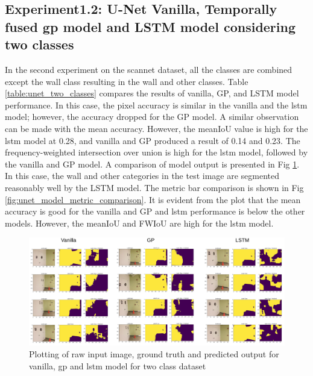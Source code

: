     \subsection{Experiment1.2: U-Net Vanilla, Temporally fused gp model and LSTM model considering two classes}
	In the second experiment on the scannet dataset, all the classes are combined except the wall class resulting in the wall and other classes. Table \ref{table:unet_two_classes} compares the results of vanilla, GP, and LSTM model performance. In this case, the pixel accuracy is similar in the vanilla and the lstm model; however, the accuracy dropped for the GP model. A similar observation can be made with the mean accuracy. However, the meanIoU value is high for the lstm model at 0.28, and vanilla and GP produced a result of 0.14 and 0.23. The frequency-weighted intersection over union is high for the lstm model, followed by the vanilla and GP model. A comparison of model output is presented in Fig \ref{fig:output_vanilla}. In this case, the wall and other categories in the test image are segmented reasonably well by the LSTM model. The metric bar comparison is shown in Fig \ref{fig:unet_model_metric_comparison}. It is evident from the plot that the mean accuracy is good for the vanilla and GP and lstm performance is below the other models. However, the meanIoU and FWIoU are high for the lstm model.

	\begin{figure}[h]
		\centering
		\includegraphics[width=16cm]{images/output_unet_two_classes.png}
		\caption{Plotting of raw input image, ground truth and predicted output for vanilla, gp and lstm model for two class dataset}
		\label{fig:output_vanilla}
	\end{figure}
	
